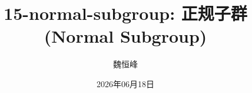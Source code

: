 \documentclass[]{beamer}
\title[15-normal-subgroup: 正规子群]{15-normal-subgroup: 正规子群 (Normal Subgroup)}
\author[魏恒峰]{\large 魏恒峰}
\institute{hfwei@hnu.edu.cn}
\date{2026年06月18日}
\begin{document}
\maketitle




\thankyou{}

\end{document}
